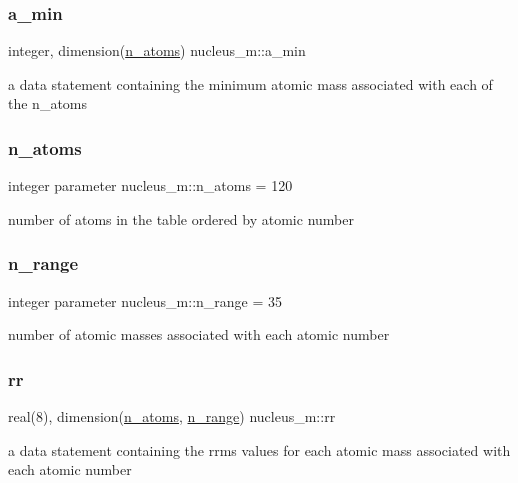 \subsubsection{\texorpdfstring{a\_min}{a\_min}}
{\footnotesize\ttfamily integer, dimension(\mbox{\hyperlink{namespacenucleus__m_a97ff520812e294bf26a6b2c330f211e5}{n\+\_\+atoms}}) nucleus\+\_\+m\+::a\+\_\+min}



a data statement containing the minimum atomic mass associated with each of the n\+\_\+atoms 

\mbox{\label{namespacenucleus__m_a97ff520812e294bf26a6b2c330f211e5}} 
\subsubsection{\texorpdfstring{n\_atoms}{n\_atoms}}
{\footnotesize\ttfamily integer parameter nucleus\+\_\+m\+::n\+\_\+atoms = 120}



number of atoms in the table ordered by atomic number 

\mbox{\label{namespacenucleus__m_adf953c9196f6870fe5e502b4f40bea48}} 
\subsubsection{\texorpdfstring{n\_range}{n\_range}}
{\footnotesize\ttfamily integer parameter nucleus\+\_\+m\+::n\+\_\+range = 35}



number of atomic masses associated with each atomic number 

\mbox{\label{namespacenucleus__m_aadb2a0e0828722e6e3f118cdf1b07f50}} 
\subsubsection{\texorpdfstring{rr}{rr}}
{\footnotesize\ttfamily real(8), dimension(\mbox{\hyperlink{namespacenucleus__m_a97ff520812e294bf26a6b2c330f211e5}{n\+\_\+atoms}}, \mbox{\hyperlink{namespacenucleus__m_adf953c9196f6870fe5e502b4f40bea48}{n\+\_\+range}}) nucleus\+\_\+m\+::rr}



a data statement containing the rrms values for each atomic mass associated with each atomic number 

